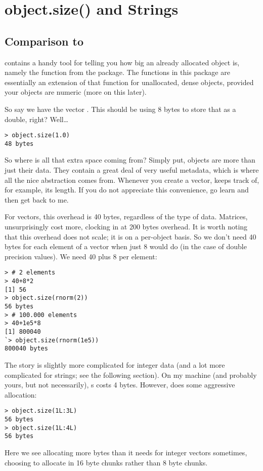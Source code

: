\section{object.size() and Strings}

\subsection{Comparison to }

\R contains a handy tool for telling you how big an already allocated 
object is, namely the  function from the  
package.  The functions in this package are essentially an extension of that 
function for unallocated, dense objects, provided your objects are numeric (more 
on this later).

So say we have the vector .  This should be using 8 bytes to 
store that  as a double, right?  Well\dots
\begin{lstlisting}[language=rr]
> object.size(1.0)
48 bytes
\end{lstlisting}

So where is all that extra space coming from?  Simply put, \R objects 
are more than just their data.  They contain a great deal of very useful 
metadata, which is where all the nice abstraction comes from.  Whenever you 
create a vector, \R keeps track of, for example, its length.  If you 
do not appreciate this convenience, go learn  and then get back to 
me.  

For vectors, this overhead is 40 bytes, regardless of the type of data.   
Matrices, unsurprisingly cost more, clocking in at 200 bytes overhead.  It is 
worth noting that this overhead does not scale; it is on a per-object basis.  So 
we don't need 40 bytes for each element of a vector when just 8 would do (in the 
case of double precision values).  We need 40 plus 8 per element:
\begin{lstlisting}[language=rr]
> # 2 elements
> 40+8*2
[1] 56
> object.size(rnorm(2))
56 bytes
> # 100.000 elements
> 40+1e5*8
[1] 800040
`> object.size(rnorm(1e5))
800040 bytes
\end{lstlisting}

The story is slightly more complicated for integer data (and a lot more 
complicated for strings; see the following section).  On my machine (and 
probably yours, but not necessarily), s costs 4 bytes.  However, 
\R does some aggressive allocation:
\begin{lstlisting}[language=rr]
> object.size(1L:3L)
56 bytes
> object.size(1L:4L)
56 bytes
\end{lstlisting}
Here we see \R allocating more bytes than it needs for integer vectors 
sometimes, choosing to allocate in 16 byte chunks rather than 8 byte chunks.

